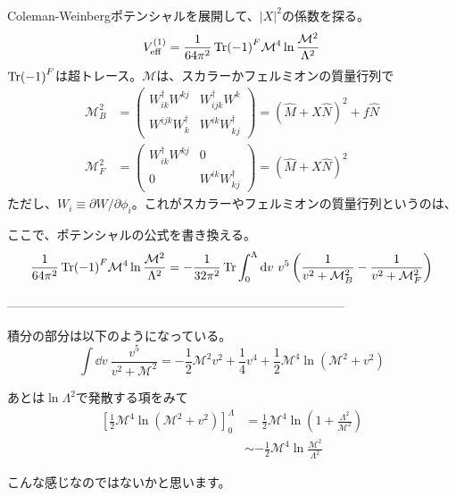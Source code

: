 \documentclass[
  unicode,a4paper,9pt,
  xcolor = {dvipsnames,svgnames},
  hyperref ={colorlinks=true,citecolor=Navy,linkcolor=NavyBlue,urlcolor=purple},
  ja=standard,lualatex
]{beamer}
\begin{document}
\begin{frame}
  \frametitle{\subsecname}

  Coleman-Weinbergポテンシャルを展開して、$|X|^2$の係数を探る。
  \begin{equation}
    V_{\textrm{eff}}^{(1)}
    =
    \frac{1}{64\pi^2}
    \Tr (-1)^{F}
    \mathcal{M}^{4}\ln\frac{\mathcal{M}^2}{\Lambda^{2}}
    \nonumber
  \end{equation}
  $\Tr (-1)^{F}$は超トレース。$\mathcal{M}$は、スカラーかフェルミオンの質量行列で
  \begin{align}
    \mathcal{M}_{B}^2
     & =
    \begin{pmatrix}
      W^{\dag}_{ik}W^{kj} & W^{\dag}_{ijk}W^{k} \\
      W^{ijk}W_{k}^{\dag} & W^{ik}W_{kj}^{\dag}
    \end{pmatrix}
    =
    (\hat{M}+X\hat{N})^2+f\hat{N}
    \nonumber
    \\
    \mathcal{M}_{F}^2
     & =
    \begin{pmatrix}
      W^{\dag}_{ik}W^{kj} & 0                   \\
      0                   & W^{ik}W_{kj}^{\dag}
    \end{pmatrix}
    =
    (\hat{M}+X\hat{N})^2
    \nonumber
  \end{align}
  ただし、$W_{i}\equiv\partial W/\partial\phi_{i}$。これがスカラーやフェルミオンの質量行列というのは、

\end{frame}


\begin{frame}

  ここで、ポテンシャルの公式を書き換える。
  \begin{equation}
    \frac{1}{64\pi^2}
    \Tr (-1)^{F}
    \mathcal{M}^{4}\ln\frac{\mathcal{M}^2}{\Lambda^{2}}
    =
    -\frac{1}{32\pi^2}
    \Tr\int^{\Lambda}_{0}\dd v\
    v^5\left( \frac{1}{v^2+\mathcal{M}_{B}^2}-\frac{1}{v^2+\mathcal{M}_{F}^2} \right)
    \nonumber
  \end{equation}

  ---------------------------------------------------------------------------------

  積分の部分は以下のようになっている。
  \begin{equation}
    \int\dd v\
    \frac{v^5}{v^2+\mathcal{M}^2}
    =
    -\frac{1}{2}\mathcal{M}^2 v^2
    +
    \frac{1}{4}v^4
    +
    \frac{1}{2}\mathcal{M}^4\ln(\mathcal{M}^2+v^2)
    \nonumber
  \end{equation}

  あとは$\ln \Lambda^2$で発散する項をみて
  \begin{align}
    \left[
      \frac{1}{2}\mathcal{M}^4\ln(\mathcal{M}^2+v^2)
      \right]_{0}^{\Lambda}
     & =
    \frac{1}{2}\mathcal{M}^4\ln\left( 1+\frac{\Lambda^2}{\mathcal{M}^2} \right)
    \nonumber
    \\
     & \sim
    -
    \frac{1}{2}\mathcal{M}^4\ln\frac{\mathcal{M}^2}{\Lambda^2}
    \nonumber
  \end{align}

  こんな感じなのではないかと思います。

\end{frame}
\end{document}
